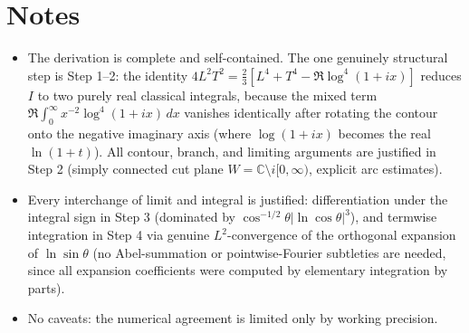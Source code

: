 \documentclass[11pt]{article}
\theoremstyle{remark}
\begin{document}
\section*{Notes}

\begin{itemize}
\item The derivation is complete and self-contained. The one genuinely structural step is Step 1--2: the identity $4L^2T^2=\tfrac23[L^4+T^4-\Re\log^4(1+ix)]$ reduces $I$ to two purely real classical integrals, because the mixed term $\Re\int_0^\infty x^{-2}\log^4(1+ix)\,dx$ vanishes identically after rotating the contour onto the negative imaginary axis (where $\log(1+ix)$ becomes the real $\ln(1+t)$). All contour, branch, and limiting arguments are justified in Step 2 (simply connected cut plane $W=\mathbb{C}\setminus i[0,\infty)$, explicit arc estimates).
\item Every interchange of limit and integral is justified: differentiation under the integral sign in Step 3 (dominated by $\cos^{-1/2}\theta|\ln\cos\theta|^3$), and termwise integration in Step 4 via genuine $L^2$-convergence of the orthogonal expansion of $\ln\sin\theta$ (no Abel-summation or pointwise-Fourier subtleties are needed, since all expansion coefficients were computed by elementary integration by parts).
\item No caveats: the numerical agreement is limited only by working precision.
\end{itemize}
\end{document}
